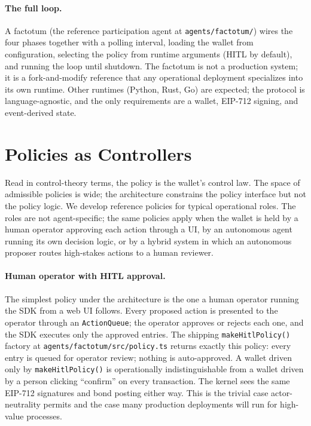 \documentclass[11pt,a4paper]{article}
\theoremstyle{definition}
\theoremstyle{remark}
\begin{document}
\paragraph{The full loop.}
A factotum (the reference participation agent at
\texttt{agents/factotum/}) wires the four phases together with a
polling interval, loading the wallet from configuration,
selecting the policy from runtime arguments (HITL by default),
and running the loop until shutdown. The factotum is not a
production system; it is a fork-and-modify reference that any
operational deployment specializes into its own runtime. Other
runtimes (Python, Rust, Go) are expected; the protocol is
language-agnostic, and the only requirements are a wallet,
EIP-712 signing, and event-derived state.

\section{Policies as Controllers}
\label{sec:policies}

Read in control-theory terms, the policy is the wallet's control
law. The space of admissible policies is wide; the architecture
constrains the policy interface but not the policy logic. We
develop reference policies for typical operational roles. The
roles are not agent-specific; the same policies apply when the
wallet is held by a human operator approving each action through
a UI, by an autonomous agent running its own decision logic, or by
a hybrid system in which an autonomous proposer routes high-stakes
actions to a human reviewer.

\paragraph{Human operator with HITL approval.}
The simplest policy under the architecture is the one a human
operator running the SDK from a web UI follows. Every proposed
action is presented to the operator through an
\texttt{ActionQueue}; the operator approves or rejects each one,
and the SDK executes only the approved entries. The shipping
\texttt{makeHitlPolicy()} factory at
\texttt{agents/factotum/src/policy.ts} returns exactly this
policy: every entry is queued for operator review; nothing is
auto-approved. A wallet driven only by \texttt{makeHitlPolicy()}
is operationally indistinguishable from a wallet driven by a
person clicking ``confirm'' on every transaction. The kernel
sees the same EIP-712 signatures and bond posting either way.
This is the trivial case actor-neutrality permits and the case
many production deployments will run for high-value processes.
\end{document}
